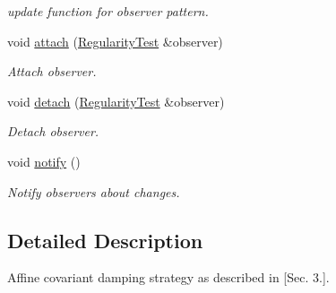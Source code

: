 \begin{DoxyCompactItemize}
\begin{DoxyCompactList}\small\item\em update function for observer pattern. \end{DoxyCompactList}\item 
\hypertarget{classSpacy_1_1Mixin_1_1MixinConnection_abb5520ee6b22dd993d78f142939a1ed4}{void \hyperlink{classSpacy_1_1Mixin_1_1MixinConnection_abb5520ee6b22dd993d78f142939a1ed4}{attach} (\hyperlink{classSpacy_1_1Mixin_1_1RegularityTest_a548d9d45c31c7833266bd3b20dc1aa7e}{Regularity\-Test} \&observer)}\label{classSpacy_1_1Mixin_1_1MixinConnection_abb5520ee6b22dd993d78f142939a1ed4}

\begin{DoxyCompactList}\small\item\em Attach observer. \end{DoxyCompactList}\item 
\hypertarget{classSpacy_1_1Mixin_1_1MixinConnection_adda739590c487679c26f60e50aedb73f}{void \hyperlink{classSpacy_1_1Mixin_1_1MixinConnection_adda739590c487679c26f60e50aedb73f}{detach} (\hyperlink{classSpacy_1_1Mixin_1_1RegularityTest_a548d9d45c31c7833266bd3b20dc1aa7e}{Regularity\-Test} \&observer)}\label{classSpacy_1_1Mixin_1_1MixinConnection_adda739590c487679c26f60e50aedb73f}

\begin{DoxyCompactList}\small\item\em Detach observer. \end{DoxyCompactList}\item 
\hypertarget{classSpacy_1_1Mixin_1_1MixinConnection_a1ddeaa78a3bb4a38c2cca36d1f99fe36}{void \hyperlink{classSpacy_1_1Mixin_1_1MixinConnection_a1ddeaa78a3bb4a38c2cca36d1f99fe36}{notify} ()}\label{classSpacy_1_1Mixin_1_1MixinConnection_a1ddeaa78a3bb4a38c2cca36d1f99fe36}

\begin{DoxyCompactList}\small\item\em Notify observers about changes. \end{DoxyCompactList}\end{DoxyCompactItemize}


\subsection{Detailed Description}
Affine covariant damping strategy as described in \cite{Deuflhard2004} \mbox{[}Sec. 3.\mbox{]}. 

